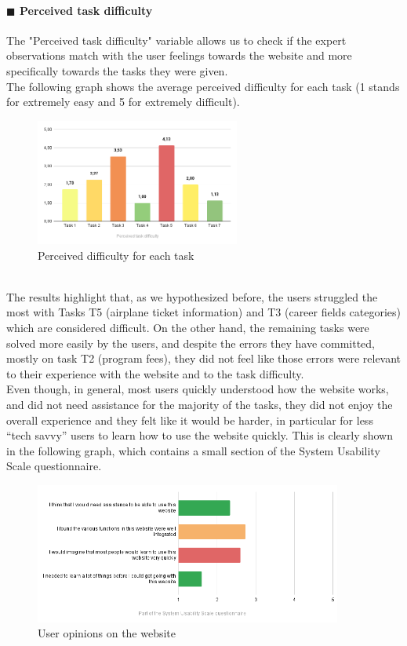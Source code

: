 \documentclass[11pt]{article} %
\begin{document}
\paragraph{$\blacksquare$ Perceived task difficulty}
The "Perceived task difficulty" variable allows us to check if the expert observations match with the user feelings towards the website and more specifically towards the tasks they were given.\\
The following graph shows the average perceived difficulty for each task (1 stands for extremely easy and 5 for extremely difficult).
\begin{figure}[ht]
  \centering
    \includegraphics[width=0.6\textwidth]{Images/diff.png}
    \caption{Perceived difficulty for each task}
\end{figure}\\
The results highlight that, as we hypothesized before, the users struggled the most with Tasks T5 (airplane ticket information) and T3 (career fields categories) which are considered difficult.
On the other hand, the remaining tasks were solved more easily by the users, and despite the errors they have committed, mostly on task T2 (program fees), they did not feel like those errors were relevant to their experience with the website and to the task difficulty.
\\Even though, in general, most users quickly understood how the website works, and did not need assistance for the majority of the tasks, they did not enjoy the overall experience and they felt like it would be harder, in particular for less “tech savvy” users to learn how to use the website quickly. This is clearly shown in the following graph, which contains a small section of the System Usability Scale questionnaire.
\begin{figure}[ht]
  \centering
    \includegraphics[width=0.9\textwidth]{Images/difficulties.png}
    \caption{User opinions on the website}
\end{figure}
\end{document}
